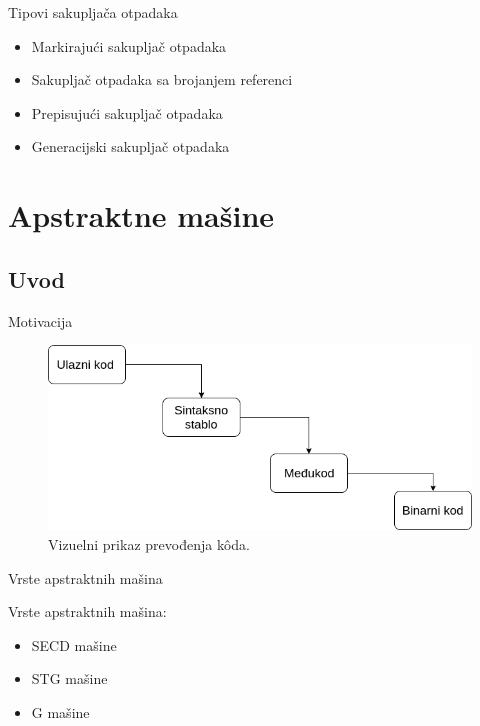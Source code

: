 \documentclass[xcolor={dvipsnames}, 11pt]{beamer}
\begin{document}
\begin{frame}{Tipovi sakupljača otpadaka}
	\begin{itemize}
		\item Markirajući sakupljač otpadaka
		\item Sakupljač otpadaka sa brojanjem referenci
		\item Prepisujući sakupljač otpadaka
		\item Generacijski sakupljač otpadaka
	\end{itemize}
\end{frame}



\section{Apstraktne mašine}
\subsection{Uvod}
\begin{frame}{Motivacija}
	\begin{figure}[H]
 		\centering
 		\includegraphics[width=\textwidth,height=\textheight,keepaspectratio]{slika1.png}
 		\caption{Vizuelni prikaz prevođenja k\^ oda.}
 		\label{fig:primerGmasine}
 	\end{figure}
\end{frame}

\begin{frame}{Vrste apstraktnih mašina}

	Vrste apstraktnih mašina:
	\begin{itemize}
	\item SECD mašine
	\item STG mašine
	\item G mašine
	\end{itemize}

\end{frame}
\end{document}
